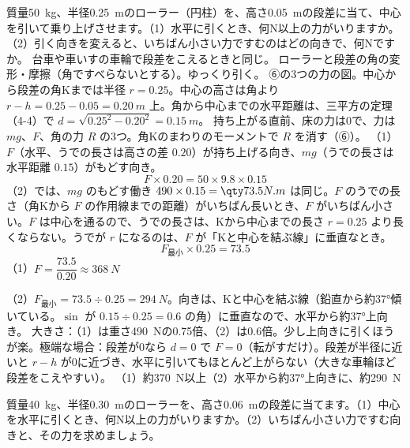 \begin{phreidai}[段差にローラーを引き上げる]
\label{ph:力-5:ex16}質量\qty{50}{kg}、半径\qty{0.25}{m}のローラー（円柱）を、高さ\qty{0.05}{m}の段差に当て、中心を引いて乗り上げさせます。（1）水平に引くとき、何N以上の力がいりますか。（2）引く向きを変えると、いちばん小さい力ですむのはどの向きで、何Nですか。
\phbamen
台車や車いすの車輪で段差をこえるときと同じ。
\phmushi
ローラーと段差の角の変形・摩擦（角ですべらないとする）。ゆっくり引く。
\phzu
⑥の3つの力の図。中心から段差の角Kまでは半径 $r=0.25$。中心の高さは角より $r-h=0.25-0.05=\qty{0.20}{m}$ 上。角から中心までの水平距離は、三平方の定理（4-4）で $d=\sqrt{0.25^2-0.20^2}=\qty{0.15}{m}$。
\phriyu
持ち上がる直前、床の力は0で、力は $mg$、$F$、角の力 $R$ の3つ。角Kのまわりのモーメントで $R$ を消す（⑥）。
\phtateru
（1）$F$（水平、うでの長さは高さの差 $0.20$）が持ち上げる向き、$mg$（うでの長さは水平距離 $0.15$）がもどす向き。
\[ F\times0.20=50\times9.8\times0.15 \]
（2）では、$mg$ のもどす働き $490\times0.15=\pxfNm{73.5}$ は同じ。$F$ のうでの長さ（角Kから $F$ の作用線までの距離）がいちばん長いとき、$F$ がいちばん小さい。$F$ は中心を通るので、うでの長さは、Kから中心までの長さ $r=0.25$ より長くならない。うでが $r$ になるのは、$F$ が「Kと中心を結ぶ線」に垂直なとき。
\[ F_{\text{最小}}\times0.25=73.5 \]
\phtoku
（1）$F=\dfrac{73.5}{0.20}\approx\qty{368}{N}$\par
（2）$F_{\text{最小}}=73.5\div 0.25=\qty{294}{N}$。向きは、Kと中心を結ぶ線（鉛直から約37°傾いている。$\sin$ が $0.15\div 0.25=0.6$ の角）に垂直なので、水平から約37°上向き。
\phtashikame
大きさ：（1）は重さ\qty{490}{N}の0.75倍、（2）は0.6倍。少し上向きに引くほうが楽。\quad 極端な場合：段差が0なら $d=0$ で $F=0$（転がすだけ）。段差が半径に近いと $r-h$ が0に近づき、水平に引いてもほとんど上がらない（大きな車輪ほど段差をこえやすい）。
\kotae （1）約\qty{370}{N}以上\quad（2）水平から約37°上向きに、約\qty{290}{N}
\end{phreidai}
\begin{jibun}
質量\qty{40}{kg}、半径\qty{0.30}{m}のローラーを、高さ\qty{0.06}{m}の段差に当てます。（1）中心を水平に引くとき、何N以上の力がいりますか。（2）いちばん小さい力ですむ向きと、その力を求めましょう。
\end{jibun}


